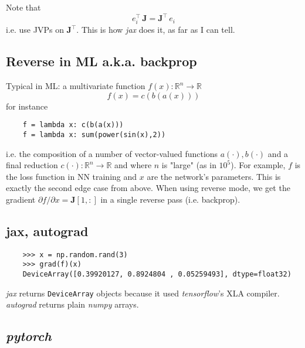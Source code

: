\documentclass[paper=a4,11pt,headsepline]{scrartcl}
\newcommand{\ve}[1]{\ensuremath{\bm{\mathit{#1}}}}
\newcommand{\ma}[1]{\ensuremath{\bm{\mathbf{#1}}}}
\newcommand{\ra}{\ensuremath{\rightarrow}}
\newcommand{\pdi}[2]{\partial #1/\partial #2}
\newcommand{\soft}[1]{\textsl{#1}\xspace}
\newcommand{\numpy}{\soft{numpy}}
\newcommand{\pytorch}{\soft{pytorch}}
\newcommand{\jax}{\soft{jax}}
\newcommand{\autograd}{\soft{autograd}}
\newcommand{\tf}{\soft{tensorflow}}
\newcommand{\co}[1]{\texttt{#1}}
\begin{document}
Note that
\begin{equation*}
    \ve e_i^\top\,\ma J = \ma J^\top\,\ve e_i
\end{equation*}
i.e. use JVPs on $\ma J^\top$. This is how \jax does it, as far as I
can tell.

\subsection{Reverse in ML a.k.a. backprop}

Typical in ML: a multivariate function $f(\ve x): \mathbb R^n\ra \mathbb R$
\begin{equation*}
    f(\ve x) = c(\ve b(\ve a(\ve x)))
\end{equation*}
for instance
\begin{verbatim}
    f = lambda x: c(b(a(x)))
    f = lambda x: sum(power(sin(x),2))
\end{verbatim}
i.e. the composition of a number of vector-valued functions $\ve a(\cdot), \ve
b(\cdot)$ and a final reduction $c(\cdot): \mathbb R^n\ra \mathbb R$ and where
$n$ is "large" (as in $10^5$). For example, $f$ is the loss function in NN
training and $\ve x$ are the network's parameters. This is exactly the second
edge case from above. When using reverse mode, we get the gradient $\pdi{f}{\ve
x} = \ma J[1,:]$ in a single reverse pass (i.e. backprop).

\subsection{jax, autograd}

\begin{verbatim}
    >>> x = np.random.rand(3)
    >>> grad(f)(x)
    DeviceArray([0.39920127, 0.8924804 , 0.05259493], dtype=float32)
\end{verbatim}

\jax returns \co{DeviceArray} objects because it used \tf's XLA compiler.
\autograd returns plain \numpy arrays.

\subsection{\pytorch}
\end{document}
